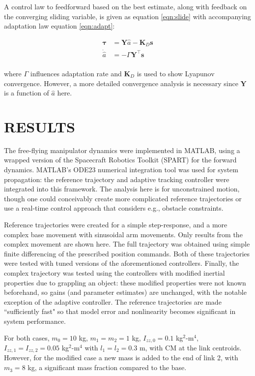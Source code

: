 \documentclass[letterpaper, 10 pt, conference]{ieeeconf}  %
\begin{document}
A control law to feedforward based on the best estimate, along with feedback on the converging sliding variable, is given as equation \ref{eqn:slide} with accompanying adaptation law equation \ref{eqn:adapt}:

 \begin{align}
	\bm{\tau} &= \mathbf{Y}\hat{a} - \mathbf{K}_D\mathbf{s}\\
	\label{eqn:slide}
	\dot{\hat{a}} &= -\Gamma\mathbf{Y}^\top\mathbf{s}\\
	\label{eqn:adapt}
\end{align}

where $\Gamma$ influences adaptation rate and $\mathbf{K}_D$ is used to show Lyapunov convergence. However, a more detailed convergence analysis is necessary since $\mathbf{Y}$ is a function of $\hat{a}$ here.

\section{RESULTS}

The free-flying manipulator dynamics were implemented in MATLAB, using a wrapped version of the Spacecraft Robotics Toolkit (SPART) for the forward dynamics. \cite{Virgili-Llop} MATLAB's ODE23 numerical integration tool was used for system propagation: the reference trajectory and adaptive tracking controller were integrated into this framework. The analysis here is for unconstrained motion, though one could conceivably create more complicated reference trajectories or use a real-time control approach that considers e.g., obstacle constraints.

Reference trajectories were created for a simple step-response, and a more complex base movement with sinusoidal arm movements. Only results from the complex movement are shown here. The full trajectory was obtained using simple finite differencing of the prescribed position commands. Both of these trajectories were tested with tuned versions of the aforementioned controllers. Finally, the complex trajectory was tested using the controllers with modified inertial properties due to grappling an object: these modified properties were not known beforehand, so gains (and parameter estimates) are unchanged, with the notable exception of the adaptive controller. The reference trajectories are made ``sufficiently fast" so that model error and nonlinearity becomes significant in system performance. 

For both cases, $m_0 = 10 $ kg, $m_1 = m_2 = 1$ kg, $I_{zz,0} = 0.1$ kg$^2$-m$^4$, $I_{zz,1} = I_{zz,2} = 0.05$ kg$^2$-m$^4$ with $l_1 = l_2 = 0.3$ m, with CM at the link centroids. However, for the modified case a new mass is added to the end of link 2, with $m_3 = 8$ kg, a significant mass fraction compared to the base.
\end{document}
